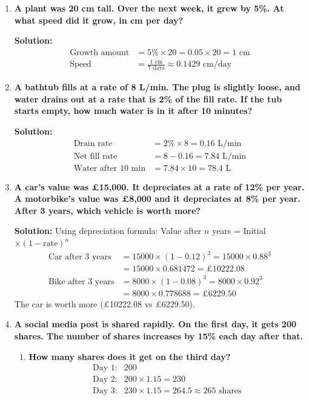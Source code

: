 \documentclass[12pt]{article}
\begin{document}
\begin{enumerate}[resume]
    \item \textbf{A plant was 20 cm tall. Over the next week, it grew by 5\%. At what speed did it grow, in cm per day?}
    
    \textbf{Solution:}
    \begin{align*}
        \text{Growth amount} &= 5\% \times 20 = 0.05 \times 20 = 1 \text{ cm} \\
        \text{Speed} &= \frac{1 \text{ cm}}{7 \text{ days}} \approx 0.1429 \text{ cm/day}
    \end{align*}
    
    \item \textbf{A bathtub fills at a rate of 8 L/min. The plug is slightly loose, and water drains out at a rate that is 2\% of the fill rate. If the tub starts empty, how much water is in it after 10 minutes?}
    
    \textbf{Solution:}
    \begin{align*}
        \text{Drain rate} &= 2\% \times 8 = 0.16 \text{ L/min} \\
        \text{Net fill rate} &= 8 - 0.16 = 7.84 \text{ L/min} \\
        \text{Water after 10 min} &= 7.84 \times 10 = 78.4 \text{ L}
    \end{align*}
    
    \item \textbf{A car's value was £15,000. It depreciates at a rate of 12\% per year. A motorbike's value was £8,000 and it depreciates at 8\% per year. After 3 years, which vehicle is worth more?}
    
    \textbf{Solution:}
    Using depreciation formula: Value after \(n\) years = Initial \(\times (1 - \text{rate})^n\)
    \begin{align*}
        \text{Car after 3 years} &= 15000 \times (1 - 0.12)^3 = 15000 \times 0.88^3 \\
        &= 15000 \times 0.681472 = £10222.08 \\
        \text{Bike after 3 years} &= 8000 \times (1 - 0.08)^3 = 8000 \times 0.92^3 \\
        &= 8000 \times 0.778688 = £6229.50
    \end{align*}
    The car is worth more (£10222.08 vs £6229.50).
    
    \item \textbf{A social media post is shared rapidly. On the first day, it gets 200 shares. The number of shares increases by 15\% each day after that.}
    \begin{enumerate}
        \item \textbf{How many shares does it get on the third day?}
        \begin{align*}
            \text{Day 1:} & 200 \\
            \text{Day 2:} & 200 \times 1.15 = 230 \\
            \text{Day 3:} & 230 \times 1.15 = 264.5 \approx 265 \text{ shares}
        \end{align*}
        

\end{enumerate}
\end{enumerate}
\end{document}
